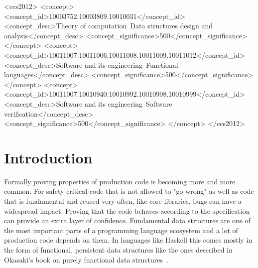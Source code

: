 \documentclass[sigplan,screen,review,anonymous]{acmart}
\begin{document}
\begin{CCSXML}
<ccs2012>
   <concept>
       <concept_id>10003752.10003809.10010031</concept_id>
       <concept_desc>Theory of computation~Data structures design and analysis</concept_desc>
       <concept_significance>500</concept_significance>
       </concept>
   <concept>
       <concept_id>10011007.10011006.10011008.10011009.10011012</concept_id>
       <concept_desc>Software and its engineering~Functional languages</concept_desc>
       <concept_significance>500</concept_significance>
       </concept>
   <concept>
       <concept_id>10011007.10010940.10010992.10010998.10010999</concept_id>
       <concept_desc>Software and its engineering~Software verification</concept_desc>
       <concept_significance>500</concept_significance>
       </concept>
 </ccs2012>
\end{CCSXML}



\maketitle

\section{Introduction}

Formally proving properties of production code is becoming more and more common. For safety critical code that is not allowed to "go wrong" as well as code that is fundamental and reused very often, like core libraries, bugs can have a widespread impact. Proving that the code behaves according to the specification can provide an extra layer of confidence. Fundamental data structures are one of the most important parts of a programming language ecosystem and a lot of production code depends on them. In languages like Haskell this comes mostly in the form of functional, persistent data structures like the ones described in Okasaki's book on purely functional data structures~\cite{okasaki}.
\end{document}
